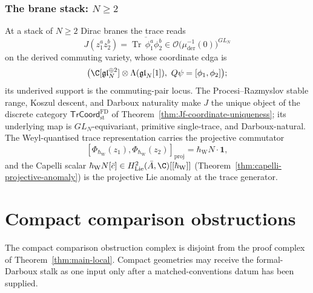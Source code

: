 \documentclass[11pt]{memoir}
\begin{document}
\subsubsection{The brane stack: \texorpdfstring{$N\ge 2$}{N >= 2}}\label{sssec:ex-N-brane}

At a stack of $N\ge 2$ Dirac branes the trace reads
\[
  J(z_1^a z_2^b)=\overline{\operatorname{Tr}\,\phi_1^a\phi_2^b}
   \in\mathcal O\bigl(\mu^{-1}_{\mathrm{der}}(0)\bigr)^{GL_N}
\]
on the derived commuting variety, whose coordinate cdga is
\[
  \bigl(\C[\mathfrak{gl}_N^{\oplus2}]\otimes
  \Lambda(\mathfrak{gl}_N[1]),\ Q\psi=[\phi_1,\phi_2]\bigr);
\]
its underived support is the commuting-pair locus.  The
Procesi--Razmyslov stable range, Koszul descent, and Darboux naturality
make \(J\) the unique object of the discrete category
\(\mathsf{TrCoord}^{\mathrm{FD}}_{\mathrm{st}}\) of
Theorem~\ref{thm:Jf-coordinate-uniqueness}; its underlying map is
\(GL_N\)-equivariant, primitive single-trace, and Darboux-natural.  The
Weyl-quantised trace representation carries
the projective commutator
\[
  [\Phi_{\hbar_{\mathrm{W}}}(z_1),
   \Phi_{\hbar_{\mathrm{W}}}(z_2)]_{\mathrm{proj}}
    =\hbar_{\mathrm{W}}N\cdot\mathbf 1,
\]
and the Capelli scalar
$\hbar_{\mathrm{W}}N[\bar c]\in H^2_{\mathrm{Lie}}(\bar A,\C)[[\hbar_{\mathrm{W}}]]$
(Theorem~\ref{thm:capelli-projective-anomaly}) is the projective
Lie anomaly at the trace generator.

\section{Compact comparison obstructions}\label{sec:compact-comparison-obstructions}

The compact comparison obstruction complex is disjoint from the proof
complex of Theorem~\ref{thm:main-local}.  Compact geometries may receive
the formal-Darboux stalk as one input only after a matched-conventions
datum has been supplied.
\end{document}
